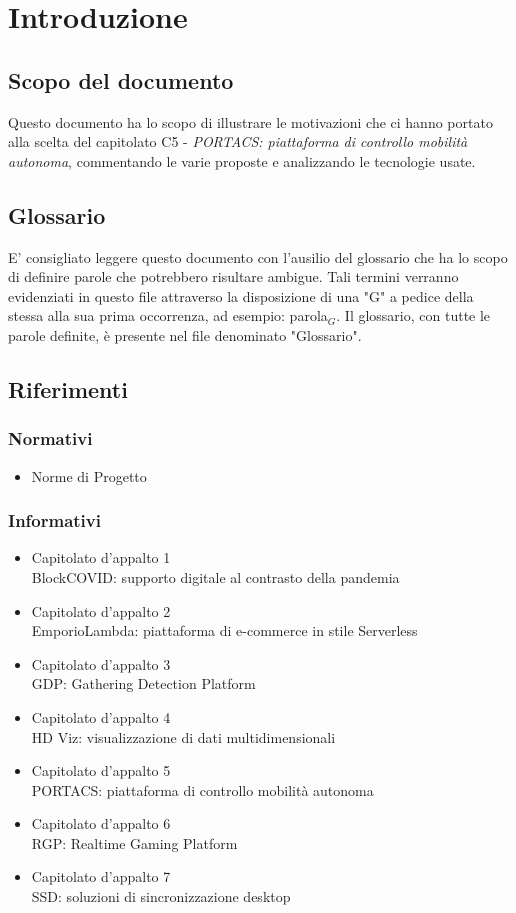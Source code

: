 \section{Introduzione}
\subsection{Scopo del documento}
Questo documento ha lo scopo di illustrare le motivazioni che ci hanno portato alla scelta del capitolato C5 - \textit{PORTACS: piattaforma di controllo mobilità autonoma}, commentando le varie proposte e analizzando le tecnologie usate.

\subsection{Glossario}
E' consigliato leggere questo documento con l'ausilio del glossario che ha lo scopo di definire parole che potrebbero risultare ambigue. Tali termini verranno evidenziati in questo file attraverso la disposizione di una "G" a pedice della stessa alla sua prima occorrenza, ad esempio: parola$_G$.
Il glossario, con tutte le parole definite, è presente nel file denominato "Glossario".

\subsection{Riferimenti}
\subsubsection{Normativi}
\begin{itemize}
  \item Norme di Progetto
  
\end{itemize}
\subsubsection{Informativi}
\begin{itemize}
  \item Capitolato d'appalto 1 \\
  BlockCOVID: supporto digitale al contrasto della pandemia
  \item Capitolato d'appalto 2 \\
  EmporioLambda: piattaforma di e-commerce in stile Serverless
  \item Capitolato d'appalto 3 \\
  GDP: Gathering Detection Platform
  \item Capitolato d'appalto 4 \\
  HD Viz: visualizzazione di dati multidimensionali
  \item Capitolato d'appalto 5 \\
  PORTACS: piattaforma di controllo mobilità autonoma
  \item Capitolato d'appalto 6 \\
  RGP: Realtime Gaming Platform
  \item Capitolato d'appalto 7 \\
  SSD: soluzioni di sincronizzazione desktop
\end{itemize}